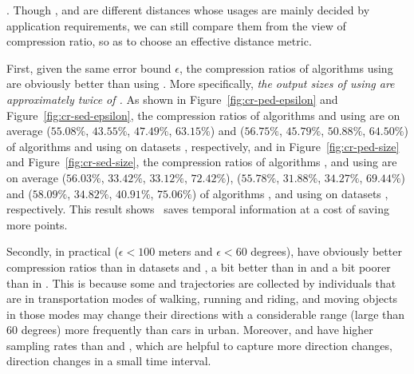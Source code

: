 .
Though \ped, \sed and \dad are different distances whose usages are mainly decided by application requirements, we can still compare them from the view of compression ratio, so as to choose an effective distance metric.

First, given the same error bound $\epsilon$, the compression ratios of algorithms using \ped are obviously better
than using \sed. More specifically, \emph{the output sizes of using \sed are approximately twice of \ped.}
%
As shown in Figure~\ref{fig:cr-ped-epsilon} and Figure~\ref{fig:cr-sed-epsilon}, the compression ratios of algorithms \tpa and \dpa
using \ped are on average ($55.08\%$, $43.55\%$, $47.49\%$, $63.15\%$) and ($56.75\%$, $45.79\%$,
$50.88\%$, $64.50\%$) of algorithms \tpa and \dpa using \sed on datasets \dSets, respectively,
%
and in Figure~\ref{fig:cr-ped-size} and Figure~\ref{fig:cr-sed-size}, the compression ratios of algorithms \opt, \tpa and \dpa
using \ped are on average {($56.03\%$, $33.42\%$, $33.12\%$, $72.42\%$),
	($55.78\%$, $31.88\%$, $34.27\%$, $69.44\%$) and ($58.09\%$, $34.82\%$,
	$40.91\%$, $75.06\%$)} of algorithms \opt, \tpa and \dpa using \sed on datasets \dSets, respectively.
%
This result shows ~\sed saves temporal information at a cost of saving more points.


Secondly, in practical (\eg $\epsilon <100$ meters and $\epsilon < 60$ degrees), \sed have obviously better compression ratios than \dad in datasets \geolife and \mopsi, a bit better than \dad in \taxi and a bit poorer than \dad in \ucar.
This is because some \geolife and \mopsi trajectories are collected by individuals that are in transportation modes of walking, running and riding, and moving objects in those modes may change their directions with a considerable range (\eg large than $60$ degrees) more frequently than cars in urban. Moreover, \geolife and \mopsi have higher sampling rates than \taxi and \ucar, which are helpful to capture more direction changes, \ie direction changes in a small time interval.







